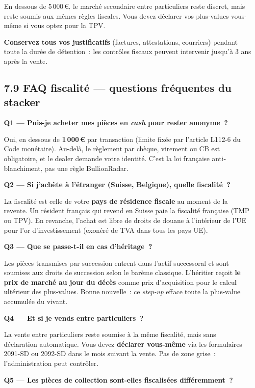 \documentclass[14pt,a4paper]{extarticle}
\begin{document}
En dessous de 5\,000\,€, le marché secondaire entre particuliers reste discret, mais reste soumis aux mêmes règles fiscales. Vous devez déclarer vos plus-values vous-même si vous optez pour la TPV.

\textbf{Conservez tous vos justificatifs} (factures, attestations, courriers) pendant toute la durée de détention~: les contrôles fiscaux peuvent intervenir jusqu'à 3 ans après la vente.

\subsection{7.9 FAQ fiscalité --- questions fréquentes du stacker}

\textbf{Q1 --- Puis-je acheter mes pièces en \textit{cash} pour rester anonyme~?}

Oui, en dessous de \textbf{1\,000\,€} par transaction (limite fixée par l'article L112-6 du Code monétaire). Au-delà, le règlement par chèque, virement ou CB est obligatoire, et le dealer demande votre identité. C'est la loi française anti-blanchiment, pas une règle BullionRadar.

\textbf{Q2 --- Si j'achète à l'étranger (Suisse, Belgique), quelle fiscalité~?}

La fiscalité est celle de votre \textbf{pays de résidence fiscale} au moment de la revente. Un résident français qui revend en Suisse paie la fiscalité française (TMP ou TPV). En revanche, l'achat est libre de droits de douane à l'intérieur de l'UE pour l'or d'investissement (exonéré de TVA dans tous les pays UE).

\textbf{Q3 --- Que se passe-t-il en cas d'héritage~?}

Les pièces transmises par succession entrent dans l'actif successoral et sont soumises aux droits de succession selon le barème classique. L'héritier reçoit \textbf{le prix de marché au jour du décès} comme prix d'acquisition pour le calcul ultérieur des plus-values. Bonne nouvelle~: ce \textit{step-up} efface toute la plus-value accumulée du vivant.

\textbf{Q4 --- Et si je vends entre particuliers~?}

La vente entre particuliers reste soumise à la même fiscalité, mais sans déclaration automatique. Vous devez \textbf{déclarer vous-même} via les formulaires 2091-SD ou 2092-SD dans le mois suivant la vente. Pas de zone grise~: l'administration peut contrôler.

\textbf{Q5 --- Les pièces de collection sont-elles fiscalisées différemment~?}
\end{document}
